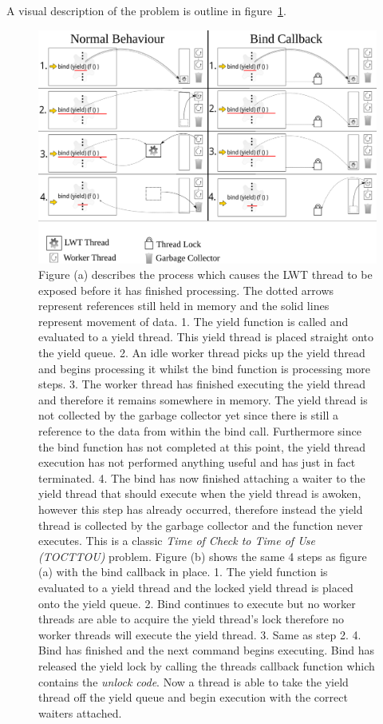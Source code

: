 \documentclass[12pt,twoside,notitlepage]{report}
\begin{document}
A visual description of the problem is outline in figure~\ref{fig:bind_callback}.
\begin{figure}[h!]
\includegraphics[width=\linewidth]{bind_callback}
\caption{Figure (a) describes the process which causes the LWT thread to be exposed before it has finished processing. The dotted arrows represent references still held in memory and the solid lines represent movement of data. 1. The
yield function is called and evaluated to a yield thread. This yield thread is placed straight onto the yield queue. 2. An idle worker thread picks up the yield thread and begins processing it whilst the bind function is processing
more steps. 3. The worker thread has finished executing the yield thread and therefore it remains somewhere in memory. The yield thread is not collected by the garbage collector yet since there is still a reference to the data from
within the bind call. Furthermore since the bind function has not completed at this point, the yield thread execution has not performed anything useful and has just in fact terminated. 4. The bind has now finished attaching a waiter to
the yield thread that should execute when the yield thread is awoken, however this step has already occurred, therefore instead the yield thread is collected by the garbage collector and the function never executes. This is a classic
{\em Time of Check to Time of Use (TOCTTOU)} problem. Figure (b) shows the same 4 steps as figure (a) with the bind callback in place. 1. The yield function is evaluated to a yield thread and the locked yield thread is placed onto the
yield queue. 2. Bind continues to execute but no worker threads are able to acquire the yield thread's lock therefore no worker threads will execute the yield thread. 3. Same as step 2. 4. Bind has finished and the next command begins
executing. Bind has released the yield lock by calling the threads callback function which contains the {\em unlock code}. Now a thread is able to take the yield thread off the yield queue and begin execution with the correct waiters
attached.}

\label{fig:bind_callback}
\end{figure}
\end{document}
